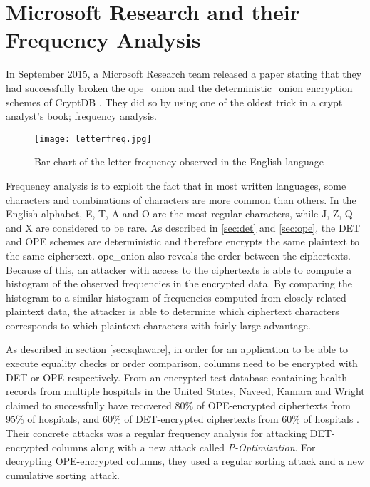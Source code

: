 \section{Microsoft Research and their Frequency Analysis}

In September 2015, a Microsoft Research team released a paper stating that they had successfully broken the \gls{ope_onion} and the \gls{deterministic_onion} encryption schemes of CryptDB \cite{microsoft_cryptdb}. They did so by using one of the oldest trick in a crypt analyst's book; frequency analysis.

\begin{wrapfigure}[14]{r}[1pt]{7.2cm}
\centering
\texttt{[image: letterfreq.jpg]}
\caption{Bar chart of the letter frequency observed in the English language}
\label{fig:letter_freq}
\end{wrapfigure}
Frequency analysis is to exploit the fact that in most written languages, some characters and combinations of characters are more common than others. In the English alphabet, E, T, A and O are the most regular characters, while J, Z, Q and X are considered to be rare. As described in \ref{sec:det} and \ref{sec:ope}, the DET and OPE schemes are deterministic and therefore encrypts the same plaintext to the same ciphertext. \gls{ope_onion} also reveals the order between the ciphertexts. Because of this, an attacker with access to the ciphertexts is able to compute a histogram of the observed frequencies in the encrypted data. By comparing the histogram to a similar histogram of frequencies computed from closely related plaintext data, the attacker is able to determine which ciphertext characters corresponds to which plaintext characters with fairly large advantage.


As described in section \ref{sec:sqlaware}, in order for an application to be able to execute equality checks or order comparison, columns need to be encrypted with DET or OPE respectively. From an encrypted test database containing health records from multiple hospitals in the United States, Naveed, Kamara and Wright claimed to successfully have recovered 80\% of OPE-encrypted ciphertexts from 95\% of hospitals, and 60\% of DET-encrypted ciphertexts from 60\% of hospitals \cite{microsoft_cryptdb}. Their concrete attacks was a regular frequency analysis for attacking DET-encrypted columns along with a new attack called \emph{P-Optimization}. For decrypting OPE-encrypted columns, they used a regular sorting attack and a new cumulative sorting attack.


